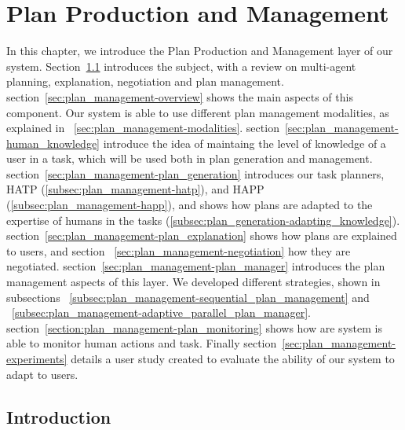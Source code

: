 
\chapter{Plan Production and Management} %

\label{chapter:plan_management} %


In this chapter, we introduce the Plan Production and Management layer of our system. Section~\ref{sec:plan_management-intro} introduces the subject, with a review on multi-agent planning, explanation, negotiation and plan management. section~\ref{sec:plan_management-overview} shows the main aspects of this component. Our system is able to use different plan management modalities, as explained in ~\ref{sec:plan_management-modalities}. section~\ref{sec:plan_management-human_knowledge} introduce the idea of maintaing the level of knowledge of a user in a task, which will be used both in plan generation and management. section~\ref{sec:plan_management-plan_generation} introduces our task planners, HATP (\ref{subsec:plan_management-hatp}), and HAPP (\ref{subsec:plan_management-happ}), and shows how plans are adapted to the expertise of humans in the  tasks (\ref{subsec:plan_generation-adapting_knowledge}). section~\ref{sec:plan_management-plan_explanation} shows how plans are explained to users, and section ~\ref{sec:plan_management-negotiation} how they are negotiated.  section~\ref{sec:plan_management-plan_manager} introduces the plan management aspects of this layer. We developed different strategies, shown in subsections ~\ref{subsec:plan_management-sequential_plan_management} and ~\ref{subsec:plan_management-adaptive_parallel_plan_manager}. section~\ref{section:plan_management-plan_monitoring} shows how are system is able to monitor human actions and task. Finally section~\ref{sec:plan_management-experiments} details a user study created to evaluate the ability of our system to adapt to users.


\section{Introduction}
\label{sec:plan_management-intro}
